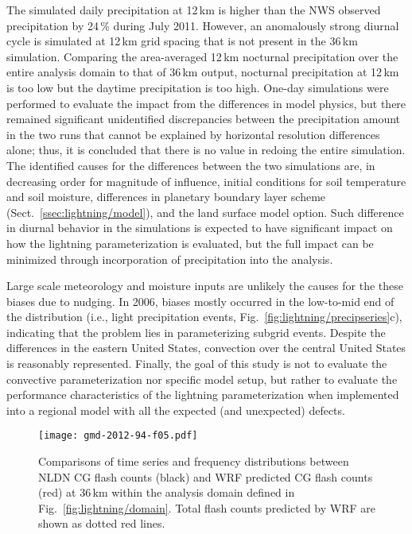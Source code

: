 The simulated daily precipitation at 12\,\unit{km} is higher than the NWS
observed precipitation by 24\,{\%} during July 2011. However, an anomalously
strong diurnal cycle is simulated at 12\,\unit{km} grid spacing that is not
present in the 36\,\unit{km} simulation. Comparing the area-averaged
12\,\unit{km} nocturnal precipitation over the entire analysis domain to that
of 36\,\unit{km} output, nocturnal precipitation at 12\,\unit{km} is too low
but the daytime precipitation is too high. One-day simulations were
performed to evaluate the impact from the differences in model physics, but
there remained significant unidentified discrepancies between the
precipitation amount in the two runs that cannot be explained by horizontal
resolution differences alone; thus, it is concluded that there is no value in
redoing the entire simulation. The identified causes for the differences
between the two simulations are, in decreasing order for magnitude of
influence, initial conditions for soil temperature and soil moisture,
differences in planetary boundary layer scheme (Sect.~\ref{ssec:lightning/model}), and
the land surface model option. Such difference in diurnal behavior in the
simulations is expected to have significant impact on how the lightning
parameterization is evaluated, but the full impact can be minimized through
incorporation of precipitation into the analysis.

Large scale meteorology and moisture inputs are unlikely the causes for the
these biases due to nudging. In 2006, biases mostly occurred in the
low-to-mid end of the distribution (i.e., light precipitation events,
Fig.~\ref{fig:lightning/precipseries}c), indicating that the problem lies in
parameterizing subgrid events. Despite the differences in the eastern United
States, convection over the central United States is reasonably represented.
Finally, the goal of this study is not to evaluate the convective
parameterization nor specific model setup, but rather to evaluate the
performance characteristics of the lightning parameterization when
implemented into a regional model with all the expected (and unexpected)
defects.


\begin{figure*}[t]
\texttt{[image: gmd-2012-94-f05.pdf]}
\caption[NLDN and WRF CG flash counts]{Comparisons of time series and frequency distributions between NLDN
CG flash counts (black) and WRF predicted CG flash counts (red) at
36\,\unit{km} within the analysis domain defined in Fig.~\ref{fig:lightning/domain}.
Total flash counts predicted by WRF are shown as dotted red lines.}
      \label{fig:lightning/cgseries}
\end{figure*}


